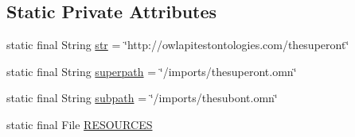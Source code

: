 \subsection*{Static Private Attributes}
\begin{DoxyCompactItemize}
\item 
static final String \hyperlink{classorg_1_1semanticweb_1_1owlapi_1_1api_1_1test_1_1syntax_1_1_manchester_import_test_case_a5a5543eb0e4e8be1effa4ea03c0132ee}{str} = \char`\"{}http\-://owlapitestontologies.\-com/thesuperont\char`\"{}
\item 
static final String \hyperlink{classorg_1_1semanticweb_1_1owlapi_1_1api_1_1test_1_1syntax_1_1_manchester_import_test_case_a5ace9cf760934e3ae989815e4dc5cb22}{superpath} = \char`\"{}/imports/thesuperont.\-omn\char`\"{}
\item 
static final String \hyperlink{classorg_1_1semanticweb_1_1owlapi_1_1api_1_1test_1_1syntax_1_1_manchester_import_test_case_a485fa8bea88923b6716534ce72a5341e}{subpath} = \char`\"{}/imports/thesubont.\-omn\char`\"{}
\item 
static final File \hyperlink{classorg_1_1semanticweb_1_1owlapi_1_1api_1_1test_1_1syntax_1_1_manchester_import_test_case_ad0a7e1db75b84e9a8894e64a46c6876a}{R\-E\-S\-O\-U\-R\-C\-E\-S}
\end{DoxyCompactItemize}


